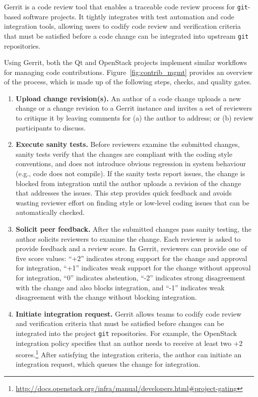 Gerrit is a code review tool that enables a traceable code review process for {\tt git}-based software projects.
It tightly integrates with test automation and code integration tools, allowing users to codify code review and verification criteria that must be satisfied before a code change can be integrated into upstream {\tt git} repositories.

Using Gerrit, both the {\sc Qt} and {\sc OpenStack} projects implement similar workflows for managing code contributions.
Figure~\ref{fig:contrib_mgmt} provides an overview of the process, which is made up of the following steps, checks, and quality gates.

\begin{enumerate}[{\bf (1)}]
    \item {\bf Upload change revision(s).}
      An author of a code change uploads a new change or a change revision to a Gerrit instance and invites a set of reviewers to critique it by leaving comments for (a) the author to address; or (b) review participants to discuss.

    \item {\bf Execute sanity tests.}
      Before reviewers examine the submitted changes, sanity tests verify that the changes are compliant with the coding style conventions, and does not introduce obvious regression in system behaviour (e.g., code does not compile).
      If the sanity tests report issues, the change is blocked from integration until the author uploads a revision of the change that addresses the issues.
      This step provides quick feedback and avoids wasting reviewer effort on finding style or low-level coding issues that can be automatically checked.

    \item {\bf Solicit peer feedback.}
      After the submitted changes pass sanity testing, the author solicits reviewers to examine the change.
      Each reviewer is asked to provide feedback and a review score.
      In Gerrit, reviewers can provide one of five score values:
      ``+2'' indicates strong support for the change and approval for integration,
      ``+1'' indicates weak support for the change without approval for integration,
      ``0'' indicates abstention,
      ``-2'' indicates strong disagreement with the change and also blocks integration, and
      ``-1'' indicates weak disagreement with the change without blocking integration.

    \item {\bf Initiate integration request.}
      Gerrit allows teams to codify code review and verification criteria that must be satisfied before changes can be integrated into the project {\tt git} repositories.
      For example, the {\sc OpenStack} integration policy specifies that an author needs to receive at least two +2 scores.\footnote{\url{http://docs.openstack.org/infra/manual/developers.html\#project-gating}}
      After satisfying the integration criteria, the author can initiate an integration request, which queues the change for integration.


\end{enumerate}
